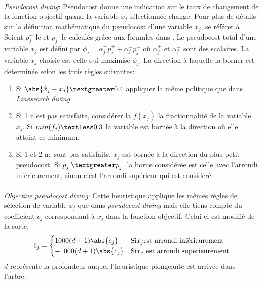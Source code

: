 \documentclass[12pt,a4paper,oneside]{book}
\theoremstyle{definition}
\begin{document}
	\paragraph{}
	\textit{Pseudocost diving}: Pseudocost donne une indication sur le taux de changement de la fonction objectif quand la variable $x_j$ sélectionnée change.
	Pour plus de détails sur la définition mathématique du pseudocost d'une variable $x_j$, se référer à \cite{martin1999integer}
	Soient $p^+_j$ le  et $p^-_j$ le  calculés grâce aux formules dans \cite{martin1999integer}. Le pseudocost total d'une variable $x_j$ est défini par $ \phi_j = \alpha^+_j p^+_j + \alpha^-_j p^-_j$ où $\alpha^+_j$ et $\alpha^-_j$ sont des scalaires. La variable $x_j$ choisie est celle qui maximise $\phi_j$. La direction à laquelle la borner est déterminée selon les trois règles suivantes:
	\begin{enumerate}
		\item Si $\abs{\hat{x}_j - \dot{x}_j} \textgreater 0.4$ appliquer la même politique que dans \textit{Linesearch diving}
		\item Si 1 n'est pas satisfaite, considérer la $f(x_j)$ la fractionnalité de la variable $x_j$. Si $min(f_j) \textless 0.3$ la variable est bornée à la direction où elle atteint ce minimum.
		\item Si 1 et 2 ne sont pas satisfaits, $x_j$ est bornée à la direction du plus petit pseudocost. Si $p^+_j \textgreater p^-_j$ la borne considérée est celle avec l'arrondi inférieurement, sinon c'est l'arrondi supérieur qui est considéré. 
	\end{enumerate}
	
	\paragraph{}
	\textit{Objective pseudocost diving}: Cette heuristique applique les mêmes règles de sélection de variable $x_j$ que dans \textit{pseudocost diving} mais elle tiens compte du coefficient $c_j$ correspondant à $x_j$ dans la fonction objectif. Celui-ci est modifié de la sorte:
	\[
		\hat{c}_j = \begin{cases}
				1000 (d+1) \abs{c_j} & \text{Si} x_j \text{est arrondi inférieurement} \\
				-1000 (d+1) \abs{c_j} & \text{Si} x_j \text{ est arrondi supérieurement} \\
		\end{cases}
	\]
	$d$ représente la profondeur auquel l'heuristique plongeante est arrivée dans l'arbre.
	
\end{document}
